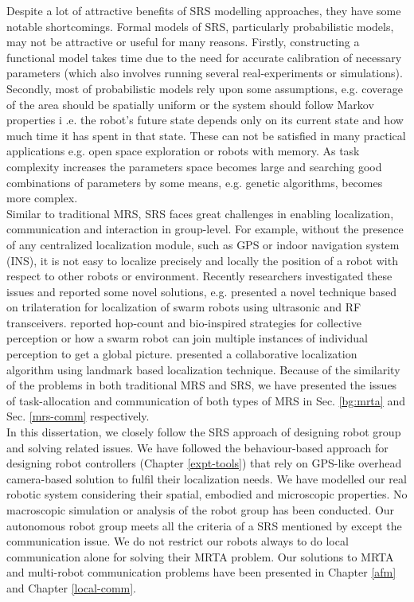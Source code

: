 Despite a lot of attractive benefits of SRS modelling approaches, they have some notable shortcomings. Formal models of SRS, particularly probabilistic models, may not be attractive or useful for many reasons. Firstly, constructing a functional model takes time due to the need for accurate calibration of necessary parameters (which also involves running several real-experiments or simulations). 
Secondly, most of probabilistic models rely upon some assumptions, e.g. coverage of the area should be spatially uniform or the system should follow Markov properties i .e. the robot's future state depends only on its current state and how much time it has spent in that state. These can not be satisfied in many practical applications e.g. open space exploration or robots with memory. As task complexity increases the parameters space becomes large and searching good combinations of parameters by some means, e.g. genetic algorithms, becomes more complex.\\
Similar to traditional MRS, SRS faces great challenges in enabling localization, communication and  interaction in group-level. For example, without the presence of any centralized localization module, such as GPS or indoor navigation system (INS), it is not easy to localize precisely and locally the position of a robot with respect to other robots or environment. Recently researchers investigated  these issues and reported some  novel solutions, e.g.  presented a novel technique based on trilateration for localization of swarm robots using ultrasonic and RF transceivers.  reported hop-count and bio-inspired strategies for collective perception or how a swarm robot can join multiple instances of individual perception to get a global picture. \cite{Rothermich+05} presented a collaborative localization algorithm using landmark based localization technique. Because of the similarity of the problems in both traditional MRS and SRS, we have presented the issues of  task-allocation and communication of both types of MRS in Sec. \ref{bg:mrta} and Sec. \ref{mrs-comm} respectively.\\
In this dissertation, we closely follow the SRS approach of designing robot group and solving related issues. We have followed the behaviour-based approach for designing robot controllers (Chapter \ref{expt-tools}) that rely on GPS-like overhead camera-based solution to fulfil their localization needs. We have modelled our real robotic system considering their spatial, embodied and microscopic properties. No macroscopic simulation or analysis of the robot group has been conducted. Our autonomous robot group meets all the criteria of a SRS mentioned by \cite{Sahin+2005} except the communication issue. We do not restrict our robots always to do local communication alone for solving their MRTA problem. Our solutions to MRTA and multi-robot communication problems have been presented in Chapter \ref{afm} and Chapter \ref{local-comm}.
